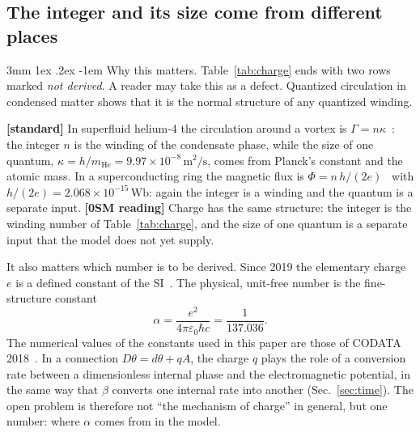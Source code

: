 \documentclass[%
 reprint, amsmath,amssymb, aps, prb, ]{revtex4-2}
\makeatletter
\numberwithin{equation}{section}
\renewcommand\paragraph{%
  \@startsection{paragraph}{4}{\z@}%
    {3mm \@plus 1ex \@minus .2ex}%
    {-1em}%
    {\normalfont\normalsize\itshape}}
\makeatother
\begin{document}
\subsection{The integer and its size come from different places}

\paragraph{Why this matters.} Table~\ref{tab:charge} ends with two rows marked \emph{not derived}. A reader may take this as a defect. Quantized circulation in condensed matter shows that it is the normal structure of any quantized winding.

\textbf{[standard]} In superfluid helium-4 the circulation around a vortex is $\Gamma=n\kappa$~\cite{ref:onsager,ref:feynman55,ref:vinen}: the integer $n$ is the winding of the condensate phase, while the size of one quantum, $\kappa=h/m_{\mathrm{He}}=9.97\times10^{-8}\,\mathrm{m^2/s}$, comes from Planck's constant and the atomic mass. In a superconducting ring the magnetic flux is $\Phi=n\,h/(2e)$~\cite{ref:deaver,ref:doll} with $h/(2e)=2.068\times10^{-15}\,\mathrm{Wb}$: again the integer is a winding and the quantum is a separate input. \textbf{[0SM reading]} Charge has the same structure: the integer is the winding number of Table~\ref{tab:charge}, and the size of one quantum is a separate input that the model does not yet supply.

It also matters which number is to be derived. Since 2019 the elementary charge $e$ is a defined constant of the SI~\cite{ref:si}. The physical, unit-free number is the fine-structure constant
\begin{equation}
\alpha=\frac{e^2}{4\pi\varepsilon_0\hbar c}=\frac{1}{137.036}.
\label{eq:alpha}
\end{equation}
The numerical values of the constants used in this paper are those of CODATA 2018~\cite{ref:codata}.
In a connection $D\theta=d\theta+qA$, the charge $q$ plays the role of a conversion rate between a dimensionless internal phase and the electromagnetic potential, in the same way that $\beta$ converts one internal rate into another (Sec.~\ref{sec:time}). The open problem is therefore not ``the mechanism of charge'' in general, but one number: where $\alpha$ comes from in the model.

\begin{center}
\end{center}
\end{document}
